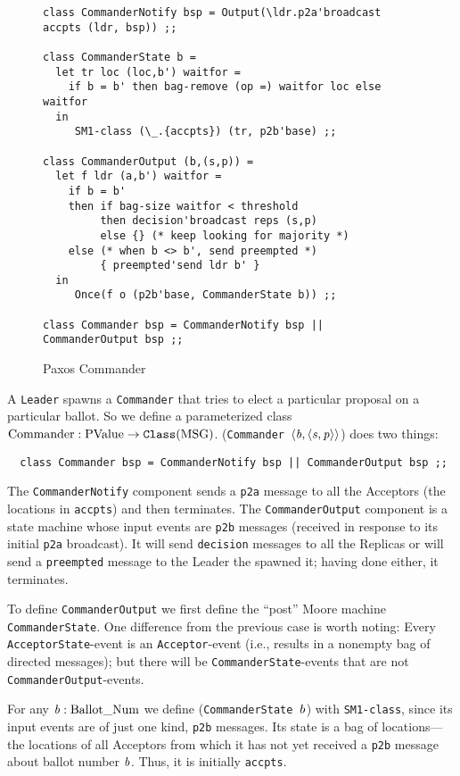 \documentclass[final]{article}
\newcommand{\listinline}[1]{\text{\lstinline{#1}}}
\newcommand{\bsp}{\mbox{$\NUPRLpair{\NUPRL{b}}{\NUPRLpair{\NUPRL{s}}{\NUPRL{p}}}$}}
\begin{document}
\begin{figure}%
  \begin{lstlisting}[basicstyle=\small]
class CommanderNotify bsp = Output(\ldr.p2a'broadcast accpts (ldr, bsp)) ;;

class CommanderState b =
  let tr loc (loc,b') waitfor =
    if b = b' then bag-remove (op =) waitfor loc else waitfor
  in
     SM1-class (\_.{accpts}) (tr, p2b'base) ;;

class CommanderOutput (b,(s,p)) =
  let f ldr (a,b') waitfor =
    if b = b'
    then if bag-size waitfor < threshold
         then decision'broadcast reps (s,p)
         else {} (* keep looking for majority *)
    else (* when b <> b', send preempted *)
         { preempted'send ldr b' }
  in
     Once(f o (p2b'base, CommanderState b)) ;;

class Commander bsp = CommanderNotify bsp || CommanderOutput bsp ;;
  \end{lstlisting}
  \caption{Paxos Commander}
  \label{fig:Paxos-Commander}
\end{figure}

A \lstinline{Leader} spawns a \lstinline{Commander} that tries to
elect a particular proposal on a particular ballot.  So we define a
parameterized class
$\listinline{Commander}:\NUPRLarrow{\listinline{PValue}}{\NUPRLclass{\listinline{MSG}}}$.
(\lstinline{Commander}~\bsp) does two things:
\begin{lstlisting}
  class Commander bsp = CommanderNotify bsp || CommanderOutput bsp ;;
\end{lstlisting}
The \lstinline{CommanderNotify} component sends a \lstinline{p2a}
message to all the Acceptors (the locations in \lstinline{accpts}) and
then terminates.  The \lstinline{CommanderOutput} component is a state
machine whose input events are \lstinline{p2b} messages (received in
response to its initial \lstinline{p2a} broadcast).  It will
send \lstinline{decision} messages to all the Replicas or will
send a \lstinline{preempted} message to the Leader the spawned it;
having done either, it terminates.

To define \lstinline{CommanderOutput} we first define the ``post''
Moore machine \lstinline{CommanderState}.  One difference from the
previous case is worth noting: Every \lstinline{AcceptorState}-event
is an \lstinline{Acceptor}-event (i.e., results in a nonempty bag of
directed messages); but there will be
\lstinline{CommanderState}-events that are not
\lstinline{CommanderOutput}-events.

For any $\NUPRL{b}:\listinline{Ballot_Num}$ we define
(\lstinline{CommanderState}~$\mathit{b}$) with \lstinline{SM1-class},
since its input events are of just one kind, \lstinline{p2b} messages.
Its state is a bag of locations---the locations of all Acceptors from
which it has not yet received a \lstinline{p2b} message about ballot
number $\mathit{b}$.  Thus, it is initially \lstinline{accpts}. 
\end{document}
